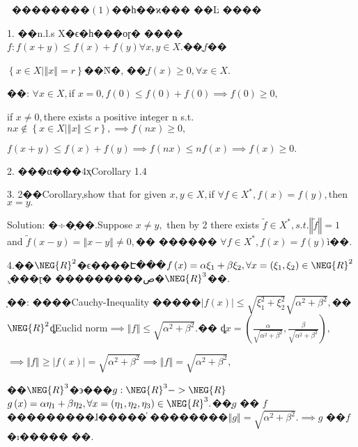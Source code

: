 \documentclass{article}
\begin{document}
\begin{CJK}{GBK}{song}


\bigskip\ 
��������$\left(
1\right) $��һ��ϰ��� ��Ŀ%
����

1. ��n.l.s X�ϵ�һ���οɼ�%
����$f:f(x+y)\leq f\left( x\right) +f\left( y\right) \forall
x,y\in X.$��֪$f$��

$\left\{ x\in X|\left\Vert x\right\Vert =r\right\} $��Ǹ�,%
��֤$f\left( x\right) \geq 0,\forall x\in X.$

��: $\forall x\in X,$if $x=0,f\left( 0\right) \leq f\left( 0\right)
+f\left( 0\right) \implies f\left( 0\right) \geq 0,$

if $x\neq 0,$there exists a positive integer n s.t. $nx\notin \left\{ x\in
X|\left\Vert x\right\Vert \leq r\right\} ,\implies f\left( nx\right) \geq 0,$

$f(x+y)\leq f\left( x\right) +f\left( y\right) \implies f\left( nx\right)
\leq nf\left( x\right) \implies f\left( x\right) \geq 0.$

2. ���α���4ҳCorollary 1.4

3. 2��Corollary,show that for given $x,y\in X,$if $\forall f\in
X^{\ast },f\left( x\right) =f\left( y\right) ,$then $x=y.$

Solution: �÷�֤��.Suppose $x\neq y,$ then by 2
there exists $\tilde{f}\in X^{\ast },s.t.\left\Vert \tilde{f}\right\Vert =1$
and $\tilde{f}\left( x-y\right) =\left\Vert x-y\right\Vert \neq 0,$��%
������ $\forall f\in X^{\ast },f\left( x\right) =f\left(
y\right) $ì��.

4.��$\NEG{R}^{2}$�ϵ����Է���$%
f\left( x\right) =\alpha \xi _{1}+\beta \xi _{2},\forall x=\left( \xi
_{1},\xi _{2}\right) \in \NEG{R}^{2}$,֤���ɽ�%
���������ص�$\NEG{R}^{3}$��.

֤��: ����Cauchy-Inequality �����$%
\left\vert f\left( x\right) \right\vert \leq \sqrt{\xi _{1}^{2}+\xi _{2}^{2}}%
\sqrt{\alpha ^{2}+\beta ^{2}},$��$\NEG{R}^{2}$ȡEuclid norm$%
\implies \left\Vert f\right\Vert \leq \sqrt{\alpha ^{2}+\beta ^{2}}.$��%
ȡ$x=\left( \frac{\alpha }{\sqrt{\alpha ^{2}+\beta ^{2}}},\frac{\beta 
}{\sqrt{\alpha ^{2}+\beta ^{2}}}\right) ,$

$\implies \left\Vert f\right\Vert \geq \left\vert f\left( x\right)
\right\vert =\sqrt{\alpha ^{2}+\beta ^{2}}\implies \left\Vert f\right\Vert =%
\sqrt{\alpha ^{2}+\beta ^{2}},$

��$\NEG{R}^{3}$�϶���$g:\NEG{R}^{3}->\NEG{R}$ $%
g\left( x\right) =\alpha \eta _{1}+\beta \eta _{2},\forall x=\left( \eta
_{1},\eta _{2},\eta _{3}\right) \in \NEG{R}^{3}.$��֤$g$ ��%
$f$���������ɺ�����ͬ%
��������$\left\Vert g\right\Vert =\sqrt{\alpha
^{2}+\beta ^{2}}.\implies g$ ��$f$ �ı�����%
��.


\end{CJK}
\end{document}
